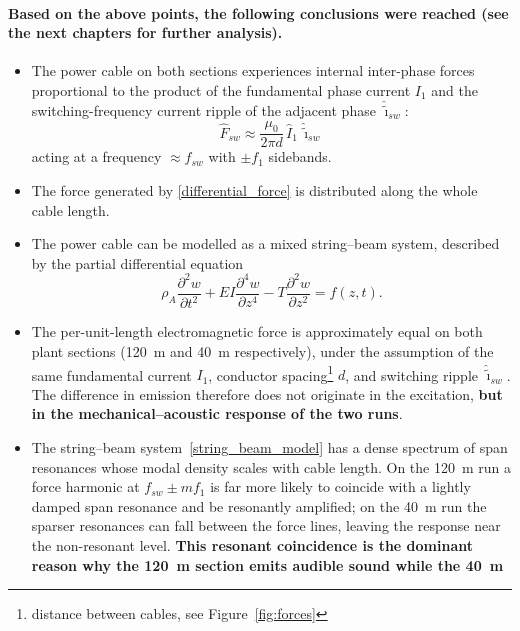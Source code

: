 \documentclass[11pt,a4paper,oneside]{book}
\begin{document}
\begin{onehalfspace}
\paragraph{Based on the above points, the following conclusions were reached (see the next chapters for further analysis).}
\begin{itemize}
	\item[--] The power cable on both sections experiences internal inter-phase
	forces proportional to the product of the fundamental phase current $I_1$
	and the switching-frequency current ripple of the adjacent phase
	$\hat{\tilde\imath}_{sw}$:
	\begin{equation}
		\boxed{\;\hat F_{sw}\approx\frac{\mu_0}{2\pi d}\,\hat I_1\,\hat{\tilde\imath}_{sw}\;}
		\label{differential_force}
	\end{equation}
	acting at a frequency $\approx f_{sw}$ with $\pm f_1$ sidebands.
	\item[--] The force generated by \eqref{differential_force} is distributed
	along the whole cable length.
	\item[--] The power cable can be modelled as a mixed string--beam system,
	described by the partial differential equation
	\begin{equation}
		\rho_A\frac{\partial^2 w}{\partial t^2}
		+EI\frac{\partial^4 w}{\partial z^4}
		-T\frac{\partial^2 w}{\partial z^2}
		=f(z,t).
		\label{string_beam_model}
	\end{equation}
	\item[--] The per-unit-length electromagnetic force is approximately equal
	on both plant sections (\SI{120}{\meter} and  \SI{40}{\meter} respectively), under the assumption of the same fundamental current
	$I_1$, conductor spacing\footnote{distance between cables, see  Figure~\ref{fig:forces}} $d$, and switching ripple
	$\hat{\tilde\imath}_{sw}$. The difference in emission therefore does not
	originate in the excitation, \textbf{but in the mechanical--acoustic response of
	the two runs}.
	\item[--] The string--beam system~\eqref{string_beam_model} has a dense
	spectrum of span resonances whose modal density scales with cable length.
	On the \SI{120}{\meter} run a force harmonic at $f_{sw}\pm m f_1$ is far
	more likely to coincide with a lightly damped span resonance and be
	resonantly amplified; on the \SI{40}{\meter} run the sparser resonances can
	fall between the force lines, leaving the response near the non-resonant
	level. \textbf{This resonant coincidence is the dominant reason why the
	\SI{120}{\meter} section emits audible sound while the \SI{40}{\meter}
}
\end{itemize}
\end{onehalfspace}
\end{document}
